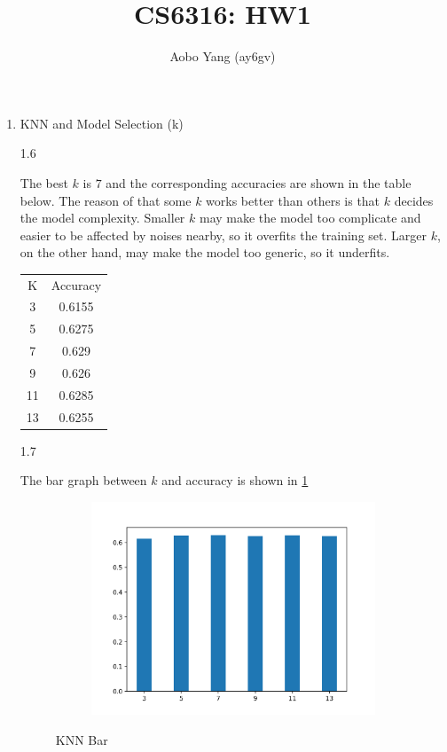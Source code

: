\documentclass[11pt]{article}
\begin{document}
\author{Aobo Yang (ay6gv)}
\title{CS6316: HW1}
\maketitle

\medskip

\begin{enumerate}

\item
KNN and Model Selection (k)

1.6
\medskip

The best $k$ is $7$ and the corresponding accuracies are shown in the table below. The reason of that some $k$ works better than others is that $k$ decides the model complexity. Smaller $k$ may make the model too complicate and easier to be affected by noises nearby, so it overfits the training set. Larger $k$, on the other hand, may make the model too generic, so it underfits.

\begin{center}
  \begin{tabular}{ |c|c| }
   \hline
   K & Accuracy \\
   3 & 0.6155 \\
   5 & 0.6275 \\
   7 & 0.629 \\
   9 & 0.626 \\
   11 & 0.6285 \\
   13 & 0.6255 \\
   \hline
  \end{tabular}
\end{center}

1.7
\medskip

The bar graph between $k$ and accuracy is shown in \ref{fig:knn_bar}

\begin{figure}[!h]
  \centering
  \begin{subfigure}[b]{0.4\linewidth}
    \includegraphics[width=\linewidth]{figures/knn_bar.png}
  \end{subfigure}
  \caption{KNN Bar}
  \label{fig:knn_bar}
\end{figure}


\end{enumerate}
\end{document}

